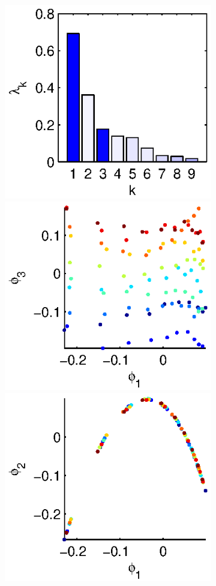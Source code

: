 \begin{figure}[t]
\begin{subfigure}[t]{1.5in}
\vspace{1.2in}
\caption{}
\end{subfigure}
%
\begin{subfigure}[t]{1.5in}
\centering
\includegraphics[height=\figheight]{chemotaxis2_evals}
\includegraphics[height=\figheight]{chemotaxis2_embed_good}
\includegraphics[height=\figheight]{chemotaxis2_embed_bad}

\end{subfigure}
\end{figure}
